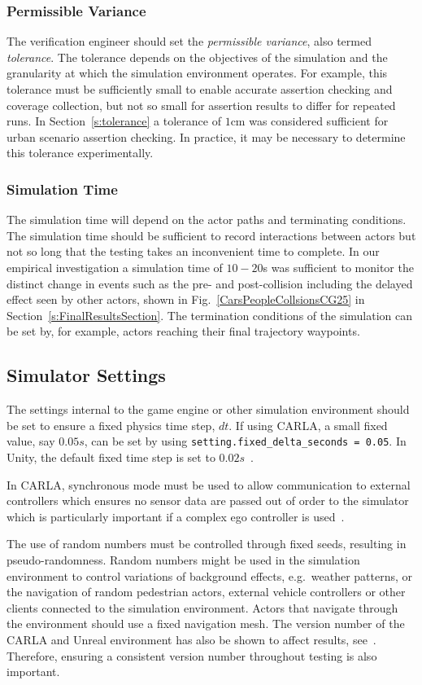 \subsubsection{Permissible Variance} \label{s:threshold}
The verification engineer should set the \textit{permissible variance}, also termed \textit{tolerance}.
The tolerance depends on the objectives of the simulation and the granularity at which the simulation environment operates. For example, this tolerance must be sufficiently small to enable accurate assertion checking and coverage collection, but not so small for assertion results to differ for repeated runs. In Section~\ref{s:tolerance} a tolerance of $1$cm was considered sufficient for urban scenario assertion checking. In practice, it may be necessary to determine this tolerance experimentally. 

\subsubsection{Simulation Time} 
The simulation time will depend on the actor paths and terminating conditions. The simulation time should be sufficient to record interactions between actors but not so long that the testing takes an inconvenient time to complete. In our empirical investigation a simulation time of $10-20$s was sufficient to monitor the distinct change in events such as the pre- and post-collision including the delayed effect seen by other actors, shown in Fig.~\ref{CarsPeopleCollsionsCG25} in Section~\ref{s:FinalResultsSection}. The termination conditions of the simulation can be set by, for example, actors reaching their final trajectory waypoints. 

\subsection{Simulator Settings}
The settings internal to the game engine or other simulation environment should be set to ensure a fixed physics time step, $dt$. If using CARLA, a small fixed value, say $0.05s$, can be set by using \texttt{setting.fixed\_delta\_seconds = 0.05}. In Unity, the default fixed time step is set to $0.02s$~\cite{MonoBehaviour_unity}. 

In CARLA, synchronous mode must be used to allow communication to external controllers which ensures no sensor data are passed out of order to the simulator which is particularly important if a complex ego controller is used~\cite{carla_sim_config}. 

The use of random numbers must be controlled through fixed seeds, resulting in pseudo-randomness. Random numbers might be used in the simulation environment to control variations of background effects, e.g.\ weather patterns, or the navigation of random pedestrian actors, external vehicle controllers or other clients connected to the simulation environment. Actors that navigate through the environment should use a fixed navigation mesh. The version number of the CARLA and Unreal environment has also be shown to affect results, see~\cite{TSLUnrealEngineTesting}. Therefore, ensuring a consistent version number throughout testing is also important.

